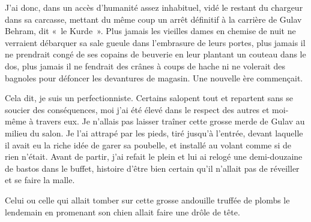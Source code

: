 J’ai donc, dans un accès d’humanité assez inhabituel, vidé le restant du chargeur dans sa carcasse, mettant du même coup un arrêt définitif à la carrière de Gulav Behram, dit «~le Kurde~». Plus jamais les vieilles dames en chemise de nuit ne verraient débarquer sa sale gueule dans l’embrasure de leurs portes, plus jamais il ne prendrait congé de ses copains de beuverie en leur plantant un couteau dans le dos, plus jamais il ne fendrait des crânes à coups de hache ni ne volerait des bagnoles pour défoncer les devantures de magasin. Une nouvelle ère commençait.

Cela dit, je suis un perfectionniste. Certains salopent tout et repartent sans se soucier des conséquences, moi j’ai été élevé dans le respect des autres et moi-même à travers eux. Je n’allais pas laisser traîner cette grosse merde de Gulav au milieu du salon. Je l’ai attrapé par les pieds, tiré jusqu’à l’entrée, devant laquelle il avait eu la riche idée de garer sa poubelle, et installé au volant comme si de rien n’était. Avant de partir, j’ai refait le plein et lui ai relogé une demi-douzaine de bastos dans le buffet, histoire d’être bien certain qu’il n’allait pas de réveiller et se faire la malle.

Celui ou celle qui allait tomber sur cette grosse andouille truffée de plombs le lendemain en promenant son chien allait faire une drôle de tête.

%
%
